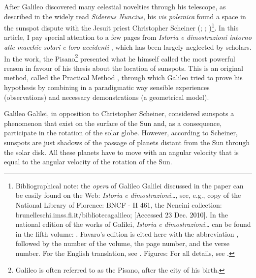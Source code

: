 \begin{artengenv}
\lettrine[loversize=0.13,lines=2,lraise=-0.03,nindent=0em,findent=0.2pt]%
{A}{}fter Galileo discovered many celestial novelties through his telescope, as described in the widely read
\textit{Sidereus Nuncius}, his \textit{vis polemica} found a space in the sunspot dispute with the Jesuit priest
Christopher Scheiner (\cite[pp.238–259]{camerota_galileo_2004}; \cite[chap.2.6]{fantoli_galileo:_2003};
\cite{heilbron_galileo_2010,galilei_sunspots_2010-1,shea_galileo_1970,sierotowicz_o_2013})\footnote{Bibliographical note: the
\textit{opera} of Galileo Galilei discussed in the paper can be easily found on the Web: \textit{Istoria e
dimostrazioni\ldots}, \parencite{galilei_istoria_1613} see, e.g., copy of the National Library of Florence: BNCF -
II 461, the Nencini collection: brunelleschi.imss.fi.it/bibliotecagalileo; [\textcolor{black}{Accessed 23 Dec. 2010]}.
In the national edition of the works of Galilei, \textit{Istoria e dimostrazioni\ldots} can be found in the fifth volume:
\parencite[pp.25–239]{favaro_opere_1895}.
Favaro’s edition is cited here with the abbreviation , followed
by the number of the volume, the page number, and the verse number. For the English translation, see
\parencite{galilei_sunspots_2010}. Figures: For all details, see
\parencite{sierotowicz_o_2013}.
}. In this article, I pay special attention to a few pages from \textit{Istoria e dimostrazioni intorno alle macchie
solari e loro accidenti}
\parencite{galilei_istoria_1613},
which has been largely neglected by scholars. In the
work, the Pisano\footnote{Galileo is often referred to as the Pisano, after the city of his birth.} presented what he
himself called the most powerful reason in favour of his thesis about the location of sunspots. This is an original
method, called the Practical Method
\parencite[see  V, 121.5;][p.112]{galilei_sunspots_2010},
through which
Galileo tried to prove his hypothesis by combining in a paradigmatic way sensible experiences (observations) and
necessary demonstrations (a geometrical model).

\enlargethispage{-1\baselineskip}
Galileo Galilei, in opposition to Christopher Scheiner, considered sunspots a phenomenon that exist on the surface of
the Sun and, as a consequence, participate in the rotation of the solar globe. However, according to Scheiner, sunspots
are just shadows of the passage of planets distant from the Sun through the solar disk. All these planets have to move
with an angular velocity that is equal to the angular velocity of the rotation of the Sun.



\end{artengenv}
